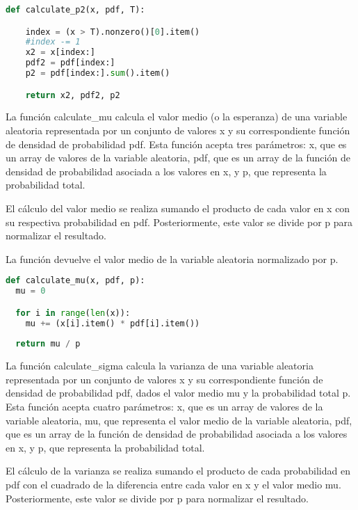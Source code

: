 \documentclass[spanish]{article}
\begin{document}
\begin{enumerate}
\begin{enumerate}
\begin{lstlisting}[language=Python, caption=Función de Probabilidades]
def calculate_p2(x, pdf, T):

    index = (x > T).nonzero()[0].item()
    #index -= 1
    x2 = x[index:]
    pdf2 = pdf[index:]
    p2 = pdf[index:].sum().item()

    return x2, pdf2, p2
\end{lstlisting}

\par La función calculate\_mu calcula el valor medio (o la esperanza) de una variable aleatoria representada por un conjunto de valores x y su correspondiente función de densidad de probabilidad pdf. Esta función acepta tres parámetros: x, que es un array de valores de la variable aleatoria, pdf, que es un array de la función de densidad de probabilidad asociada a los valores en x, y p, que representa la probabilidad total.
\vspace{5px}

\par El cálculo del valor medio se realiza sumando el producto de cada valor en x con su respectiva probabilidad en pdf. Posteriormente, este valor se divide por p para normalizar el resultado.
\vspace{5px}

\par La función devuelve el valor medio de la variable aleatoria normalizado por p.

\begin{lstlisting}[language=Python, caption=Función de Medias]
def calculate_mu(x, pdf, p):
  mu = 0

  for i in range(len(x)):
    mu += (x[i].item() * pdf[i].item())
  
  return mu / p
\end{lstlisting}
\vspace{5px}

\par La función calculate\_sigma calcula la varianza de una variable aleatoria representada por un conjunto de valores x y su correspondiente función de densidad de probabilidad pdf, dados el valor medio mu y la probabilidad total p. Esta función acepta cuatro parámetros: x, que es un array de valores de la variable aleatoria, mu, que representa el valor medio de la variable aleatoria, pdf, que es un array de la función de densidad de probabilidad asociada a los valores en x, y p, que representa la probabilidad total.
\vspace{5px}

\par El cálculo de la varianza se realiza sumando el producto de cada probabilidad en pdf con el cuadrado de la diferencia entre cada valor en x y el valor medio mu. Posteriormente, este valor se divide por p para normalizar el resultado.
\vspace{5px}


\end{enumerate}
\end{enumerate}
\end{document}
